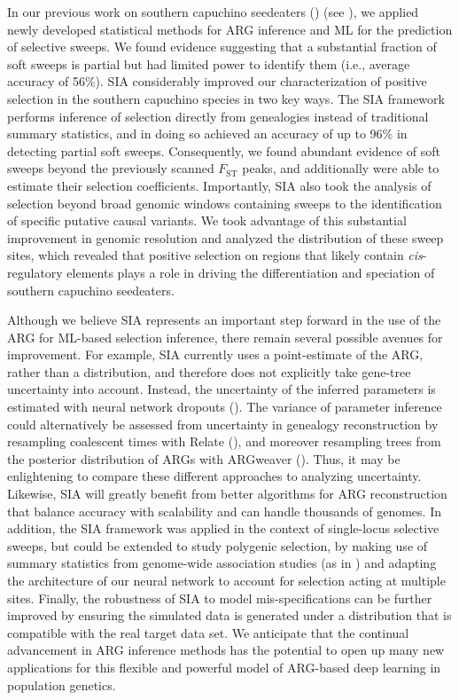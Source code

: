 In our previous work on southern capuchino seedeaters (\cite{hejase_genomic_2020}) (see ), we applied newly developed statistical methods for \ac{ARG} inference and \ac{ML} for the prediction of selective sweeps. We found evidence suggesting that a substantial fraction of soft sweeps is partial but had limited power to identify them (i.e., average accuracy of 56\%). \ac{SIA} considerably improved our characterization of positive selection in the southern capuchino species in two key ways. The \ac{SIA} framework performs inference of selection directly from genealogies instead of traditional summary statistics, and in doing so achieved an accuracy of up to 96\% in detecting partial soft sweeps. Consequently, we found abundant evidence of soft sweeps beyond the previously scanned $F_{\mathrm{ST}}$ peaks, and additionally were able to estimate their selection coefficients. Importantly, \ac{SIA} also took the analysis of selection beyond broad genomic windows containing sweeps to the identification of specific putative causal variants. We took advantage of this substantial improvement in genomic resolution and analyzed the distribution of these sweep sites, which revealed that positive selection on regions that likely contain \textit{cis}-regulatory elements plays a role in driving the differentiation and speciation of southern capuchino seedeaters.

Although we believe \ac{SIA} represents an important step forward in the use of the \ac{ARG} for \ac{ML}-based selection inference, there remain several possible avenues for improvement. For example, \ac{SIA} currently uses a point-estimate of the \ac{ARG}, rather than a distribution, and therefore does not explicitly take gene-tree uncertainty into account. Instead, the uncertainty of the inferred parameters is estimated with neural network dropouts (\cite{gal_dropout_2016}). The variance of parameter inference could alternatively be assessed from uncertainty in genealogy reconstruction by resampling coalescent times with Relate (\cite{speidel_method_2019}), and moreover resampling trees from the posterior distribution of \acp{ARG} with ARGweaver (\cite{rasmussen_genome-wide_2014}). Thus, it may be enlightening to compare these different approaches to analyzing uncertainty. Likewise, \ac{SIA} will greatly benefit from better algorithms for \ac{ARG} reconstruction that balance accuracy with scalability and can handle thousands of genomes. In addition, the \ac{SIA} framework was applied in the context of single-locus selective sweeps, but could be extended to study polygenic selection, by making use of summary statistics from genome-wide association studies (as in \cite{stern_disentangling_2021}) and adapting the architecture of our neural network to account for selection acting at multiple sites. Finally, the robustness of \ac{SIA} to model mis-specifications can be further improved by ensuring the simulated data is generated under a distribution that is compatible with the real target data set. We anticipate that the continual advancement in \ac{ARG} inference methods has the potential to open up many new applications for this flexible and powerful model of \ac{ARG}-based deep learning in population genetics.

